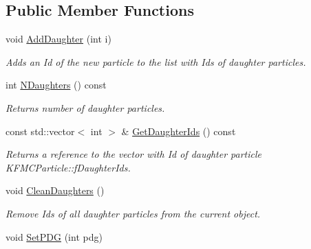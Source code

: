 \subsection*{Public Member Functions}
\begin{DoxyCompactItemize}
\item 
void \hyperlink{classKFMCParticle_afbccaab44cbd883748b589baf180bf8e}{Add\+Daughter} (int i)\hypertarget{classKFMCParticle_afbccaab44cbd883748b589baf180bf8e}{}\label{classKFMCParticle_afbccaab44cbd883748b589baf180bf8e}

\begin{DoxyCompactList}\small\item\em Adds an Id of the new particle to the list with Ids of daughter particles. \end{DoxyCompactList}\item 
int \hyperlink{classKFMCParticle_ae14cc6f58e668c7d3feb6bedbae57625}{N\+Daughters} () const \hypertarget{classKFMCParticle_ae14cc6f58e668c7d3feb6bedbae57625}{}\label{classKFMCParticle_ae14cc6f58e668c7d3feb6bedbae57625}

\begin{DoxyCompactList}\small\item\em Returns number of daughter particles. \end{DoxyCompactList}\item 
const std\+::vector$<$ int $>$ \& \hyperlink{classKFMCParticle_aa57d249e258adf12f022b58d8ad90d50}{Get\+Daughter\+Ids} () const \hypertarget{classKFMCParticle_aa57d249e258adf12f022b58d8ad90d50}{}\label{classKFMCParticle_aa57d249e258adf12f022b58d8ad90d50}

\begin{DoxyCompactList}\small\item\em Returns a reference to the vector with Id of daughter particle K\+F\+M\+C\+Particle\+::f\+Daughter\+Ids. \end{DoxyCompactList}\item 
void \hyperlink{classKFMCParticle_a57b4d9705f854d3a1717064aad0008fd}{Clean\+Daughters} ()\hypertarget{classKFMCParticle_a57b4d9705f854d3a1717064aad0008fd}{}\label{classKFMCParticle_a57b4d9705f854d3a1717064aad0008fd}

\begin{DoxyCompactList}\small\item\em Remove Ids of all daughter particles from the current object. \end{DoxyCompactList}\item 
void \hyperlink{classKFMCParticle_adb2ccad0b4b39acdf548b943b7a0ab91}{Set\+P\+DG} (int pdg)\hypertarget{classKFMCParticle_adb2ccad0b4b39acdf548b943b7a0ab91}{}\label{classKFMCParticle_adb2ccad0b4b39acdf548b943b7a0ab91}


\end{DoxyCompactItemize}
